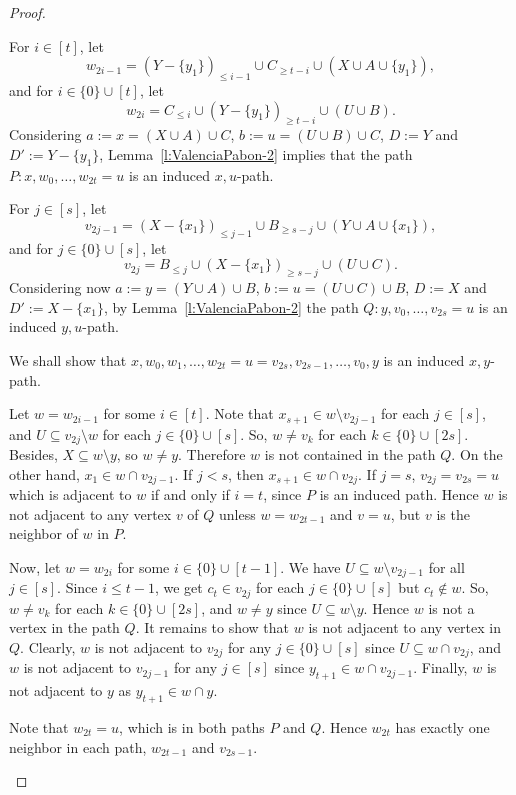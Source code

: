 \documentclass[a4paper,11pt]{article}
\begin{document}
\begin{proof}
\begin{description}
        For $i \in [t]$, let
        $$w_{2i-1}=(Y-\{y_1\})_{\leq i-1} \cup C_{\geq t-i} \cup (X\cup A\cup \{y_1\}),$$ 
        and for $i \in \{0\}\cup[t]$, let
        $$w_{2i}=C_{\leq i} \cup (Y-\{y_1\})_{\geq t-i} \cup (U\cup B).$$
        Considering $a:=x=(X\cup A)\cup C$, $b:=u=(U\cup B)\cup C$, $D:=Y$ and $D':=Y-\{y_1\}$, Lemma~\ref{l:ValenciaPabon-2} implies that the path $P:x,w_0,\ldots,w_{2t}=u$ is an induced $x,u$-path.
        
        For $j \in [s]$, let
        $$v_{2j-1}=(X-\{x_1\})_{\leq j-1} \cup B_{\geq s-j} \cup (Y\cup A\cup \{x_1\}),$$ 
        and for $j \in \{0\}\cup[s]$, let
        $$v_{2j}=B_{\leq j} \cup (X-\{x_1\})_{\geq s-j} \cup (U\cup C).$$
        Considering now $a:=y=(Y\cup A)\cup B$, $b:=u=(U\cup C)\cup B$, $D:=X$ and $D':=X-\{x_1\}$, by Lemma~\ref{l:ValenciaPabon-2} the path $Q:y,v_0,\ldots,v_{2s}=u$ is an induced $y,u$-path.

        We shall show that $x,w_0,w_1,\ldots,w_{2t}=u=v_{2s},v_{2s-1},\ldots,v_0,y$ is an induced $x,y$-path.

        Let $w=w_{2i-1}$ for some $i\in [t]$.
        Note that $x_{s+1}\in w\setminus v_{2j-1}$ for each $j\in [s]$, and $U\subseteq v_{2j}\setminus w$ for each $j\in \{0\}\cup [s]$. So, $w\neq v_k$ for each $k\in \{0\}\cup [2s]$. Besides, $X\subseteq w\setminus y$, so $w\neq y$. Therefore $w$ is not contained in the path $Q$.
        On the other hand, $x_1\in w\cap v_{2j-1}$. If $j<s$, then  $x_{s+1}\in w\cap v_{2j}$. If $j=s$, $v_{2j}=v_{2s}=u$ which is adjacent to $w$ if and only if $i=t$, since $P$ is an induced path. Hence $w$ is not adjacent to any vertex $v$ of $Q$ unless $w=w_{2t-1}$ and $v=u$, but $v$ is the neighbor of $w$  in $P$.

        Now, let $w=w_{2i}$ for some $i\in \{0\}\cup [t-1]$. We have $U\subseteq w\setminus v_{2j-1}$ for all $j\in [s]$. Since $i\leq t-1$, we get $c_t\in v_{2j}$ for each $j\in \{0\}\cup [s]$ but $c_t \notin w$. So, $w\neq v_k$ for each $k\in\{0\}\cup [2s]$, and $w\neq y$ since $U\subseteq w\setminus y$. Hence $w$ is not a vertex in the path $Q$. It remains to show that $w$ is not adjacent to any vertex in $Q$. Clearly, $w$ is not adjacent to $v_{2j}$ for any $j\in \{0\}\cup[s]$ since $U\subseteq w\cap v_{2j}$, and $w$ is not adjacent to $v_{2j-1}$ for any $j\in [s]$ since $y_{t+1}\in w\cap v_{2j-1}$. Finally, $w$ is not adjacent to $y$ as $y_{t+1}\in w\cap y$. 

        Note that $w_{2t}=u$, which is in both paths $P$ and $Q$. Hence $w_{2t}$ has exactly one neighbor in each path, $w_{2t-1}$ and $v_{2s-1}$.


\end{description}
\end{proof}
\end{document}
